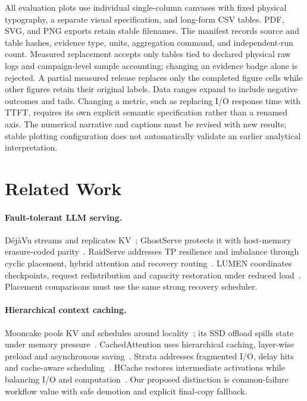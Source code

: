 \documentclass[sigplan,10pt,anonymous,nonacm]{acmart}
\begin{document}
All evaluation plots use individual single-column canvases with fixed
physical typography, a separate visual specification, and long-form CSV
tables. PDF, SVG, and PNG exports retain stable filenames. The manifest
records source and table hashes, evidence type, units, aggregation command,
and independent-run count. Measured replacement accepts only tables tied
to declared physical raw logs and campaign-level sample accounting;
changing an evidence badge alone is rejected. A partial measured release
replaces only the completed figure cells while other figures retain their
original labels. Data ranges expand to include negative outcomes and
tails. Changing a metric, such as replacing I/O response time with TTFT,
requires its own explicit semantic specification rather than a renamed
axis. The numerical narrative and captions must be revised with new
results; stable plotting configuration does not automatically validate
an earlier analytical interpretation.

\FloatBarrier

\section{Related Work}
\label{sec:related}

\paragraph{Fault-tolerant LLM serving.}
D\'ej\`aVu streams and replicates KV~\cite{strati2024dejavu}; GhostServe
protects it with host-memory erasure-coded parity~\cite{jayakody2026ghostserve}.
RaidServe addresses TP resilience and imbalance through cyclic placement,
hybrid attention and recovery routing~\cite{xu2026raidserve}. LUMEN
coordinates checkpoints, request redistribution and capacity restoration
under reduced load~\cite{cao2026lumen}. Placement comparisons must use the same strong recovery scheduler.

\paragraph{Hierarchical context caching.}
Mooncake pools KV and schedules around locality~\cite{qin2025mooncake};
its SSD offload spills state under memory pressure~\cite{mooncake2026ssdoffload}.
CachedAttention uses hierarchical caching, layer-wise preload and
asynchronous saving~\cite{gao2024cachedattention}. Strata addresses
fragmented I/O, delay hits and cache-aware scheduling~\cite{xie2026strata}.
HCache restores intermediate activations while balancing I/O and
computation~\cite{gao2025hcache}. Our proposed distinction is common-failure workflow value
with safe demotion and explicit final-copy fallback.
\end{document}
